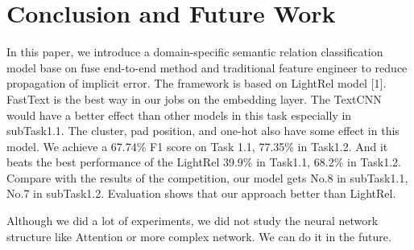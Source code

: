 \section{Conclusion and Future Work}
\label{sec:conclusion_and_future_work}
In this paper, we introduce a domain-specific semantic relation classification model base on fuse end-to-end method and traditional feature engineer to reduce propagation of implicit error. The framework is based on LightRel model [1]. FastText is the best way in our jobs on the embedding layer. The TextCNN would have a better effect than other models in this task especially in subTask1.1. The cluster, pad position, and one-hot also have some effect in this model. We achieve a 67.74\% F1 score on Task 1.1, 77.35\% in Task1.2. And it beats the best performance of the LightRel 39.9\% in Task1.1, 68.2\% in Task1.2. Compare with the results of the competition, our model gets No.8 in subTask1.1, No.7 in subTask1.2.  Evaluation shows that our approach better than LightRel.

Although we did a lot of experiments, we did not study the neural network structure like Attention or more complex network. We can do it in the future.